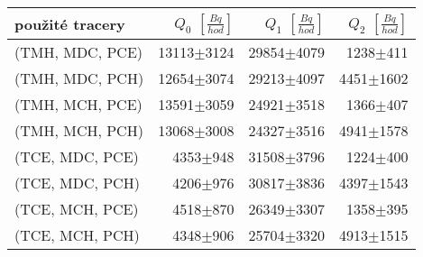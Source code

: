 \begin{tabular}{lrrr}
\toprule
použité tracery & $Q_0$ $\left[\si{\frac{Bq}{hod}}\right]$ & $Q_1$ $\left[\si{\frac{Bq}{hod}}\right]$ & $Q_2$ $\left[\si{\frac{Bq}{hod}}\right]$ \\
\midrule
(TMH, MDC, PCE) & 13113$\pm$3124 &  29854$\pm$4079 &    1238$\pm$411 \\
(TMH, MDC, PCH) & 12654$\pm$3074 &  29213$\pm$4097 &   4451$\pm$1602 \\
(TMH, MCH, PCE) & 13591$\pm$3059 &  24921$\pm$3518 &    1366$\pm$407 \\
(TMH, MCH, PCH) & 13068$\pm$3008 &  24327$\pm$3516 &   4941$\pm$1578 \\
(TCE, MDC, PCE) &   4353$\pm$948 &  31508$\pm$3796 &    1224$\pm$400 \\
(TCE, MDC, PCH) &   4206$\pm$976 &  30817$\pm$3836 &   4397$\pm$1543 \\
(TCE, MCH, PCE) &   4518$\pm$870 &  26349$\pm$3307 &    1358$\pm$395 \\
(TCE, MCH, PCH) &   4348$\pm$906 &  25704$\pm$3320 &   4913$\pm$1515 \\
\bottomrule
\end{tabular}
